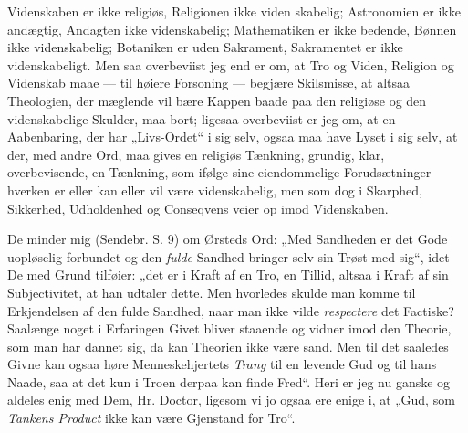 \documentclass[12pt,a4paper]{article}
\newcommand{\opage}[1]{\marginnote{\footnotesize\textit{[#1]}}}
\begin{document}
Videnskaben er ikke religiøs, Religionen ikke viden\-%
skabelig; Astronomien er ikke andægtig, Andagten ikke
videnskabelig; Mathematiken er ikke bedende, Bønnen ikke
videnskabelig; Botaniken er uden Sakrament, Sakramentet er
ikke videnskabeligt. Men saa overbeviist jeg end er om, at
Tro og Viden, Religion og Videnskab maae --- til høiere
Forsoning --- begjære Skilsmisse, at altsaa Theologien, der
mæglende vil bære Kappen baade paa den religiøse og den
videnskabelige Skulder, maa bort; ligesaa overbeviist er jeg
om, at en Aabenbaring, der har „Livs-Ordet“ i sig selv,
ogsaa maa have Lyset i sig selv, at der, med andre Ord,
maa gives en religiøs Tænkning, grundig, klar, overbevisende,
en Tænkning, som ifølge sine eiendommelige Forudsætninger
hverken er eller kan eller vil være videnskabelig, men som dog
i Skarphed, Sikkerhed, Udholdenhed og Conseqvens veier op
imod Videnskaben.

De minder mig (Sendebr. S. 9) om Ørsteds Ord:
„Med Sandheden er det Gode uopløselig forbundet og den
\emph{fulde} Sandhed bringer selv sin Trøst med sig“, idet De med
Grund tilføier: „det er i Kraft af en Tro, en Tillid, altsaa
i Kraft af sin Subjectivitet, at han udtaler dette. Men
hvorledes skulde man komme til Erkjendelsen af den fulde
\opage{12}\setcounter{footnote}{0}%
Sandhed, naar man ikke vilde \emph{respectere} det Factiske?
Saalænge noget i Erfaringen Givet bliver staaende og vidner
imod den Theorie, som man har dannet sig, da kan Theorien
ikke være sand. Men til det saaledes Givne kan ogsaa høre
Menneskehjertets \emph{Trang} til en levende Gud og til hans
Naade, saa at det kun i Troen derpaa kan finde Fred“.
Heri er jeg nu ganske og aldeles enig med Dem, Hr. Doctor,
ligesom vi jo ogsaa ere enige i, at „Gud, som \emph{Tankens
Product} ikke kan være Gjenstand for Tro“.
\end{document}
